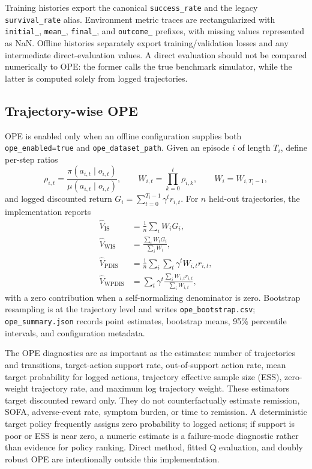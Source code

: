 \documentclass[10pt,twocolumn]{article}
\newcommand{\code}[1]{\texttt{#1}}
\newcommand{\policy}{\pi}
\newcommand{\behavior}{\mu}
\begin{document}
Training histories export the canonical \code{success\_rate} and the legacy \code{survival\_rate} alias. Environment metric traces are rectangularized with \code{initial\_}, \code{mean\_}, \code{final\_}, and \code{outcome\_} prefixes, with missing values represented as NaN. Offline histories separately export training/validation losses and any intermediate direct-evaluation values. A direct evaluation should not be compared numerically to OPE: the former calls the true benchmark simulator, while the latter is computed solely from logged trajectories.

\subsection{Trajectory-wise OPE}
\label{sec:ope}

OPE is enabled only when an offline configuration supplies both \code{ope\_enabled=true} and \code{ope\_dataset\_path}. Given an episode $i$ of length $T_i$, define per-step ratios
\begin{equation}
 \rho_{i,t}=\frac{\policy(a_{i,t}\mid o_{i,t})}{\behavior(a_{i,t}\mid o_{i,t})},\qquad
 W_{i,t}=\prod_{k=0}^{t}\rho_{i,k},\qquad W_i=W_{i,T_i-1},
\end{equation}
and logged discounted return $G_i=\sum_{t=0}^{T_i-1}\gamma^t r_{i,t}$. For $n$ held-out trajectories, the implementation reports
\begin{align}
 \widehat V_{\mathrm{IS}} &= \frac{1}{n}\sum_i W_iG_i,\\
 \widehat V_{\mathrm{WIS}} &= \frac{\sum_i W_iG_i}{\sum_iW_i},\\
 \widehat V_{\mathrm{PDIS}} &= \frac{1}{n}\sum_i\sum_t\gamma^tW_{i,t}r_{i,t},\\
 \widehat V_{\mathrm{WPDIS}} &= \sum_t\gamma^t\frac{\sum_iW_{i,t}r_{i,t}}{\sum_iW_{i,t}},
\end{align}
with a zero contribution when a self-normalizing denominator is zero. Bootstrap resampling is at the trajectory level and writes \code{ope\_bootstrap.csv}; \code{ope\_summary.json} records point estimates, bootstrap means, 95\% percentile intervals, and configuration metadata.

The OPE diagnostics are as important as the estimates: number of trajectories and transitions, target-action support rate, out-of-support action rate, mean target probability for logged actions, trajectory effective sample size (ESS), zero-weight trajectory rate, and maximum log trajectory weight. These estimators target discounted reward only. They do not counterfactually estimate remission, SOFA, adverse-event rate, symptom burden, or time to remission. A deterministic target policy frequently assigns zero probability to logged actions; if support is poor or ESS is near zero, a numeric estimate is a failure-mode diagnostic rather than evidence for policy ranking. Direct method, fitted Q evaluation, and doubly robust OPE are intentionally outside this implementation.
\end{document}
